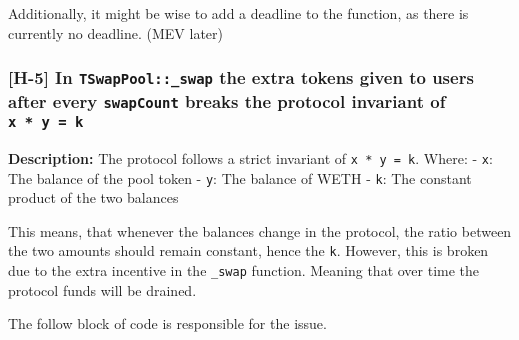 \begin{Shaded}
\begin{Highlighting}[]
\NormalTok{    \}}
\end{Highlighting}
\end{Shaded}

Additionally, it might be wise to add a deadline to the function, as
there is currently no deadline. (MEV later)

\subsubsection{\texorpdfstring{{[}H-5{]} In \texttt{TSwapPool::\_swap}
the extra tokens given to users after every \texttt{swapCount} breaks
the protocol invariant of
\texttt{x\ *\ y\ =\ k}}{{[}H-5{]} In TSwapPool::\_swap the extra tokens given to users after every swapCount breaks the protocol invariant of x * y = k}}\label{h-5-in-tswappool_swap-the-extra-tokens-given-to-users-after-every-swapcount-breaks-the-protocol-invariant-of-x-y-k}

\textbf{Description:} The protocol follows a strict invariant of
\texttt{x\ *\ y\ =\ k}. Where: - \texttt{x}: The balance of the pool
token - \texttt{y}: The balance of WETH - \texttt{k}: The constant
product of the two balances

This means, that whenever the balances change in the protocol, the ratio
between the two amounts should remain constant, hence the \texttt{k}.
However, this is broken due to the extra incentive in the
\texttt{\_swap} function. Meaning that over time the protocol funds will
be drained.

The follow block of code is responsible for the issue.

\begin{Shaded}
\begin{Highlighting}[]
\OperatorTok{++;}
        \OperatorTok{\textgreater{}=}
\OperatorTok{=} \OperatorTok{;}
\OperatorTok{,} \NormalTok{)}\OperatorTok{;}
\NormalTok{        \}}
\end{Highlighting}
\end{Shaded}


